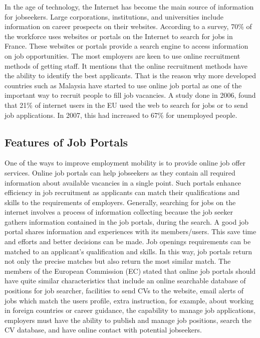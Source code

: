 \documentclass[a4paper,12pt]{report}
\begin{document}
\hspace*{12pt}In the age of technology, the Internet has become the main source of information for jobseekers. Large corporations, institutions, and universities include information on career prospects on their websites. According to a survey, 70\% of the workforce uses websites or portals on the Internet to search for jobs in France. These websites or portals provide a search engine to access information on job opportunities. The most employers are keen to use online recruitment methods of getting staff. It mentions that the online recruitment methods have the ability to identify the best applicants. That is the reason why more developed countries such as Malaysia have started to use online job portal as one of the important way to recruit people to fill job vacancies. A study done in 2006, found that 21\% of internet users in the EU used the web to search for jobs or to send job applications. In 2007, this had increased to 67\% for unemployed people. \\


\subsection{Features of Job Portals}

\hspace*{12pt}One of the ways to improve employment mobility is to provide online job offer services. Online job portals can help jobseekers as they contain all required information about available vacancies in a single point. Such portals enhance efficiency in job recruitment as applicants can match their qualifications and skills to the requirements of employers. Generally, searching for jobs on the internet involves a process of information collecting because the job seeker gathers information contained in the job portals, during the search. A good job portal shares information and experiences with its members/users. This save time and efforts and better decisions can be made. Job openings requirements can be matched to an applicant's qualification and skills. In this way, job portals return not only the precise matches but also return the most similar match. The members of the European Commission (EC) stated that online job portals should have quite similar characteristics that include an online searchable database of positions for job searcher, facilities to send CVs to the website, email alerts of jobs which match the users profile, extra instruction, for example, about working in foreign countries or career guidance, the capability to manage job applications, employers must have the ability to publish and manage job positions, search the CV database, and have online contact with potential jobseekers.\\
\pagebreak
\end{document}
